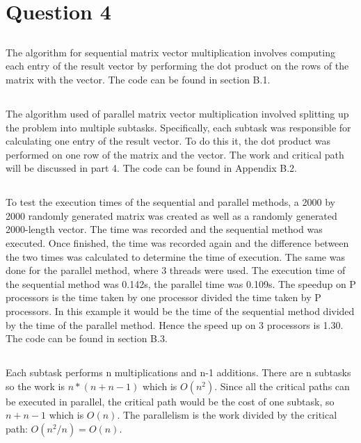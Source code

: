 \documentclass[11pt]{article}
\begin{document}
\section{Question 4}

\subsection{}
The algorithm for sequential matrix vector multiplication involves computing each entry of the result vector by performing the dot 
product on the rows of the matrix with the vector. The code can be found in section B.1.

\subsection{}
The algorithm used of parallel matrix vector multiplication involved splitting up the problem into multiple subtasks. Specifically, each 
subtask was responsible for calculating one entry of the result vector. To do this it, the dot product was performed on one row of the 
matrix and the vector. The work and critical path will be discussed in part 4. The code can be found in Appendix B.2.

\subsection{}
To test the execution times of the sequential and parallel methods, a 2000 by 2000 randomly generated matrix was created as well as a 
randomly generated 2000-length vector. The time was recorded and the sequential method was executed. Once finished, the time was 
recorded again and the difference between the two times was calculated to determine the time of execution. The same was done for the 
parallel method, where 3 threads were used. The execution time of the sequential method was 0.142s, the parallel time was 0.109s. The 
speedup on P processors is the time taken by one processor divided the time taken by P processors. In this example it would be the time 
of the sequential method divided by the time of the parallel method. Hence the speed up on 3 processors is 1.30. The code can be found 
in section B.3.

\subsection{}
Each subtask performs n multiplications and n-1 additions. There are n subtasks so the work is $n*(n+n-1)$ which is $O(n^2)$. Since all 
the critical paths can be executed in parallel, the critical path would be the cost of one subtask, so $n+n-1$ which is $O(n)$. The 
parallelism is the work divided by the critical path: $O(n^2/n) = O(n)$.
\end{document}
